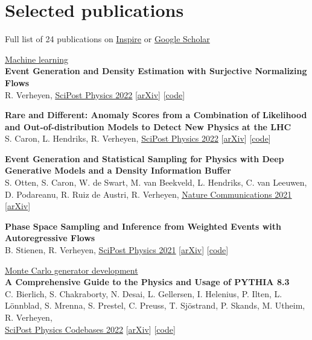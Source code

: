 \documentclass[a4paper,12pt]{article}
\begin{document}
\section{Selected publications}
Full list of 24 publications on \href{https://inspirehep.net/authors/1777870?ui-citation-summary=true}{Inspire} or \href{https://scholar.google.com/citations?user=MRTAm7UAAAAJ&hl=en&oi=ao}{Google Scholar}

\underline{\large{Machine learning}} \\ [5pt]
\textbf{Event Generation and Density Estimation with Surjective Normalizing Flows} \\
R. Verheyen, 
\href{https://scipost.org/10.21468/SciPostPhys.13.3.047}{\underline{SciPost Physics 2022}} [\href{https://arxiv.org/abs/2205.01697}{arXiv}] [\href{https://github.com/rbvh/surflows}{code}]

\textbf{Rare and Different: Anomaly Scores from a Combination of Likelihood and Out-of-distribution Models to Detect New Physics at the LHC} \\
S. Caron, L. Hendriks, R. Verheyen,
\href{https://scipost.org/10.21468/SciPostPhys.12.1.043}{\underline{SciPost Physics 2022}} [\href{https://arxiv.org/pdf/2105.14027.pdf}{arXiv}] [\href{https://github.com/bostdiek/DarkMachines-UnsupervisedChallenge}{code}]

\textbf{Event Generation and Statistical Sampling for Physics with Deep Generative Models and a Density Information Buffer} \\
S. Otten, S. Caron, W. de Swart, M. van Beekveld, L. Hendriks, C. van Leeuwen, D. Podareanu, R. Ruiz de Austri, R. Verheyen, 
\href{https://www.nature.com/articles/s41467-021-22616-z}{\underline{Nature Communications 2021}} [\href{https://arxiv.org/abs/1901.00875}{arXiv}]

\textbf{Phase Space Sampling and Inference from Weighted Events with Autoregressive Flows} \\
B. Stienen, R. Verheyen, 
\href{https://scipost.org/10.21468/SciPostPhys.10.2.038}{\underline{SciPost Physics 2021}} [\href{https://arxiv.org/pdf/2011.13445.pdf}{arXiv}] [\href{https://github.com/rbvh/PhaseSpaceAutoregressiveFlow}{code}]



\underline{\large{Monte Carlo generator development}} \\[5pt]
\textbf{A Comprehensive Guide to the Physics and Usage of PYTHIA 8.3} \\
C. Bierlich, S. Chakraborty, N. Desai, L. Gellersen, I. Helenius, P. Ilten, L. Lönnblad, S. Mrenna, S. Prestel, C. Preuss, T. Sjöstrand, P. Skands, M. Utheim, R. Verheyen, \\
\href{https://scipost.org/SciPostPhysCodeb.8-r8.3}{\underline{SciPost Physics Codebases 2022}} [\href{https://arxiv.org/abs/2203.11601}{arXiv}] [\href{https://pythia.org}{code}]
\end{document}
